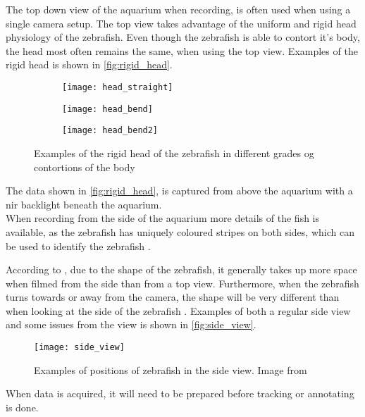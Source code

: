 The top down view of the aquarium when recording, is often used when using a single camera setup. The top view takes advantage of the uniform and rigid head physiology of the zebrafish. Even though the zebrafish is able to contort it's body, the head most often remains the same, when using the top view. Examples of the rigid head is shown in \autoref{fig:rigid_head}.

\begin{figure}[H]
	\centering
	\begin{subfigure}[b]{0.3\textwidth}
		\texttt{[image: head\_straight]}
		\label{fig:head_straight}
	\end{subfigure}
	\begin{subfigure}[b]{0.3\textwidth}
		\texttt{[image: head\_bend]}
		\label{fig:head_bend}
	\end{subfigure}
	\begin{subfigure}[b]{0.3\textwidth}
		\texttt{[image: head\_bend2]}
		\label{fig:head_bend2}
	\end{subfigure}
\caption{Examples of the rigid head of the zebrafish in different grades og contortions of the body}
\label{fig:rigid_head}
\end{figure}

The data shown in \autoref{fig:rigid_head}, is captured from above the aquarium with a \gls{nir} backlight beneath the aquarium.\\

When recording from the side of the aquarium more details of the fish is available, as the zebrafish has uniquely coloured stripes on both sides, which can be used to identify the zebrafish \citep{Karpova2018}.

According to \cite{Qian2017}, due to the shape of the zebrafish, it generally takes up more space when filmed from the side than from a top view. Furthermore, when the zebrafish turns towards or away from the camera, the shape will be very different than when looking at the side of the zebrafish \citep{Pedersen2017}. Examples of both a regular side view and some issues from the view is shown in \autoref{fig:side_view}.

\begin{figure}[H]
	\centering
	\texttt{[image: side\_view]}
	\caption{Examples of positions of zebrafish in the side view. Image from \cite{Pedersen2017}}
	\label{fig:side_view}
\end{figure}

When data is acquired, it will need to be prepared before tracking or annotating is done. 

